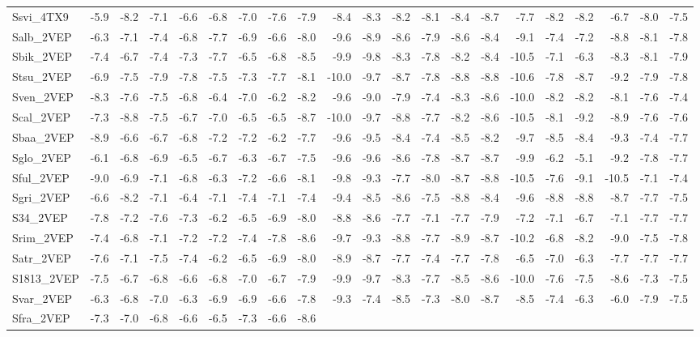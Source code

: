 \documentclass[12pt,twoside]{reedthesis}
\begin{document}
\begin{longtable}[c]{@{}lrrrrrrrrrrrrrrrrrrrr@{}}
  Ssvi\_4TX9 & -5.9 & -8.2 & -7.1 & -6.6 & -6.8 & -7.0 & -7.6 & -7.9 &
  -8.4 & -8.3 & -8.2 & -8.1 & -8.4 & -8.7 & -7.7 & -8.2 & -8.2 & -6.7 &
  -8.0 & -7.5\tabularnewline
  Salb\_2VEP & -6.3 & -7.1 & -7.4 & -6.8 & -7.7 & -6.9 & -6.6 & -8.0 &
  -9.6 & -8.9 & -8.6 & -7.9 & -8.6 & -8.4 & -9.1 & -7.4 & -7.2 & -8.8 &
  -8.1 & -7.8\tabularnewline
  Sbik\_2VEP & -7.4 & -6.7 & -7.4 & -7.3 & -7.7 & -6.5 & -6.8 & -8.5 &
  -9.9 & -9.8 & -8.3 & -7.8 & -8.2 & -8.4 & -10.5 & -7.1 & -6.3 & -8.3 &
  -8.1 & -7.9\tabularnewline
  Stsu\_2VEP & -6.9 & -7.5 & -7.9 & -7.8 & -7.5 & -7.3 & -7.7 & -8.1 &
  -10.0 & -9.7 & -8.7 & -7.8 & -8.8 & -8.8 & -10.6 & -7.8 & -8.7 & -9.2 &
  -7.9 & -7.8\tabularnewline
  Sven\_2VEP & -8.3 & -7.6 & -7.5 & -6.8 & -6.4 & -7.0 & -6.2 & -8.2 &
  -9.6 & -9.0 & -7.9 & -7.4 & -8.3 & -8.6 & -10.0 & -8.2 & -8.2 & -8.1 &
  -7.6 & -7.4\tabularnewline
  Scal\_2VEP & -7.3 & -8.8 & -7.5 & -6.7 & -7.0 & -6.5 & -6.5 & -8.7 &
  -10.0 & -9.7 & -8.8 & -7.7 & -8.2 & -8.6 & -10.5 & -8.1 & -9.2 & -8.9 &
  -7.6 & -7.6\tabularnewline
  Sbaa\_2VEP & -8.9 & -6.6 & -6.7 & -6.8 & -7.2 & -7.2 & -6.2 & -7.7 &
  -9.6 & -9.5 & -8.4 & -7.4 & -8.5 & -8.2 & -9.7 & -8.5 & -8.4 & -9.3 &
  -7.4 & -7.7\tabularnewline
  Sglo\_2VEP & -6.1 & -6.8 & -6.9 & -6.5 & -6.7 & -6.3 & -6.7 & -7.5 &
  -9.6 & -9.6 & -8.6 & -7.8 & -8.7 & -8.7 & -9.9 & -6.2 & -5.1 & -9.2 &
  -7.8 & -7.7\tabularnewline
  Sful\_2VEP & -9.0 & -6.9 & -7.1 & -6.8 & -6.3 & -7.2 & -6.6 & -8.1 &
  -9.8 & -9.3 & -7.7 & -8.0 & -8.7 & -8.8 & -10.5 & -7.6 & -9.1 & -10.5 &
  -7.1 & -7.4\tabularnewline
  Sgri\_2VEP & -6.6 & -8.2 & -7.1 & -6.4 & -7.1 & -7.4 & -7.1 & -7.4 &
  -9.4 & -8.5 & -8.6 & -7.5 & -8.8 & -8.4 & -9.6 & -8.8 & -8.8 & -8.7 &
  -7.7 & -7.5\tabularnewline
  S34\_2VEP & -7.8 & -7.2 & -7.6 & -7.3 & -6.2 & -6.5 & -6.9 & -8.0 & -8.8
  & -8.6 & -7.7 & -7.1 & -7.7 & -7.9 & -7.2 & -7.1 & -6.7 & -7.1 & -7.7 &
  -7.7\tabularnewline
  Srim\_2VEP & -7.4 & -6.8 & -7.1 & -7.2 & -7.2 & -7.4 & -7.8 & -8.6 &
  -9.7 & -9.3 & -8.8 & -7.7 & -8.9 & -8.7 & -10.2 & -6.8 & -8.2 & -9.0 &
  -7.5 & -7.8\tabularnewline
  Satr\_2VEP & -7.6 & -7.1 & -7.5 & -7.4 & -6.2 & -6.5 & -6.9 & -8.0 &
  -8.9 & -8.7 & -7.7 & -7.4 & -7.7 & -7.8 & -6.5 & -7.0 & -6.3 & -7.7 &
  -7.7 & -7.7\tabularnewline
  S1813\_2VEP & -7.5 & -6.7 & -6.8 & -6.6 & -6.8 & -7.0 & -6.7 & -7.9 &
  -9.9 & -9.7 & -8.3 & -7.7 & -8.5 & -8.6 & -10.0 & -7.6 & -7.5 & -8.6 &
  -7.3 & -7.5\tabularnewline
  Svar\_2VEP & -6.3 & -6.8 & -7.0 & -6.3 & -6.9 & -6.9 & -6.6 & -7.8 &
  -9.3 & -7.4 & -8.5 & -7.3 & -8.0 & -8.7 & -8.5 & -7.4 & -6.3 & -6.0 &
  -7.9 & -7.5\tabularnewline
  Sfra\_2VEP & -7.3 & -7.0 & -6.8 & -6.6 & -6.5 & -7.3 & -6.6 & -8.6 &

\end{longtable}
\end{document}
